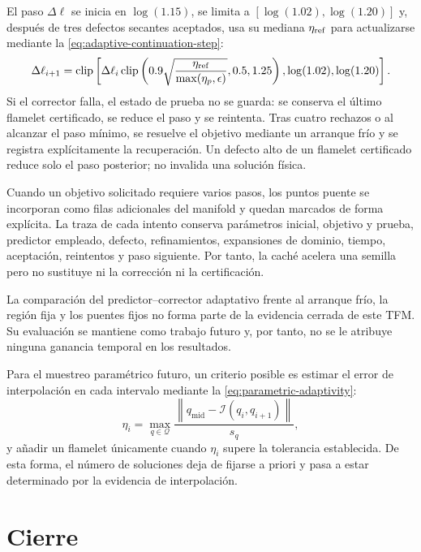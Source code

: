 \documentclass[12pt,a4paper,twoside,openany]{book}
\newcommand{\norm}[1]{\left\lVert #1\right\rVert}
\begin{document}
El paso \(\Delta\ell\) se inicia en \(\log(1.15)\), se limita a
\([\log(1.02),\log(1.20)]\) y, después de tres defectos secantes aceptados,
usa su mediana \(\eta_{\rm ref}\) para actualizarse mediante la \cref{eq:adaptive-continuation-step}:
\begin{equation}
  \Delta\ell_{i+1}=\operatorname{clip}\left[
  \Delta\ell_i\operatorname{clip}\left(
  0.9\sqrt{\frac{\eta_{\rm ref}}{\max(\eta_p,\epsilon)}},0.5,1.25\right),
  \log(1.02),\log(1.20)\right].
  \label{eq:adaptive-continuation-step}
\end{equation}
Si el corrector falla, el estado de prueba no se guarda: se conserva el último
flamelet certificado, se reduce el paso y se reintenta. Tras cuatro rechazos o
al alcanzar el paso mínimo, se resuelve el objetivo mediante un arranque frío y
se registra explícitamente la recuperación. Un defecto alto de un flamelet
certificado reduce solo el paso posterior; no invalida una solución física.

Cuando un objetivo solicitado requiere varios pasos, los puntos puente se
incorporan como filas adicionales del manifold y quedan marcados de forma
explícita. La traza de cada intento conserva parámetros inicial, objetivo y
prueba, predictor empleado, defecto, refinamientos, expansiones de dominio,
tiempo, aceptación, reintentos y paso siguiente. Por tanto, la caché acelera una
semilla pero no sustituye ni la corrección ni la certificación.

La comparación del predictor--corrector adaptativo frente al arranque frío,
la región fija y los puentes fijos no forma parte de la evidencia cerrada de
este TFM. Su evaluación se mantiene como trabajo futuro y, por tanto, no se le
atribuye ninguna ganancia temporal en los resultados.

Para el muestreo paramétrico futuro, un criterio posible es estimar el error de
interpolación en cada intervalo mediante la \cref{eq:parametric-adaptivity}:
\begin{equation}
  \eta_i=\max_{q\in\mathcal{Q}}
  \frac{\norm{q_{\mathrm{mid}}-\mathcal{I}(q_i,q_{i+1})}}
  {s_q},
  \label{eq:parametric-adaptivity}
\end{equation}
y añadir un flamelet únicamente cuando \(\eta_i\) supere la tolerancia
establecida. De esta forma, el número de soluciones deja de fijarse a priori y
pasa a estar determinado por la evidencia de interpolación.

\section{Cierre}
\end{document}
